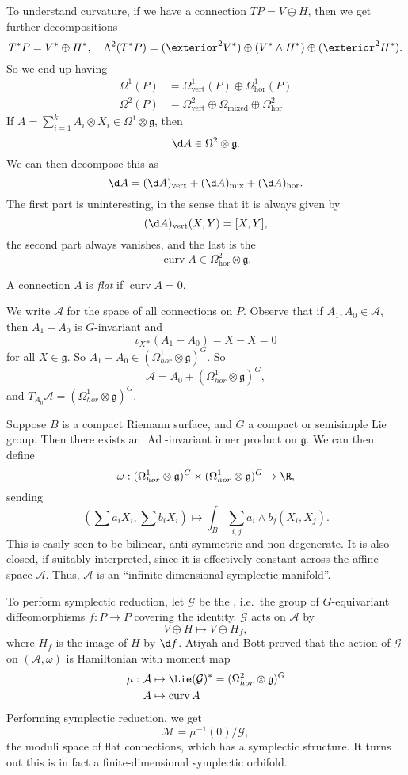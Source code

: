 \documentclass[a4paper]{article}
\DeclareMathOperator{\Ad}{Ad}
\DeclareMathOperator{\curv}{curv}
\begin{document}
To understand curvature, if we have a connection $TP = V \oplus H$, then we get further decompositions
\[
  T^*P = V^* \oplus H^*,\quad \Lambda^2 (T^*P) = (\exterior^2 V^*) \oplus (V^* \wedge H^*) \oplus (\exterior^2 H^*).
\]
So we end up having
\begin{align*}
  \Omega^1(P) &= \Omega^1_{\mathrm{vert}}(P) \oplus \Omega^1_{\mathrm{hor}}(P)\\
  \Omega^2(P) &= \Omega_{\mathrm{vert}}^2 \oplus \Omega_{\mathrm{mixed}} \oplus \Omega^2_{\mathrm{hor}}
\end{align*}
If $A = \sum_{i = 1}^k A_i \otimes X_i \in \Omega^1 \otimes \mathfrak{g}$, then
\[
  \d A \in \Omega^2 \otimes \mathfrak{g}.
\]
We can then decompose this as
\[
  \d A = (\d A)_{\mathrm{vert}}+ (\d A)_{\mathrm{mix}} + (\d A)_{\mathrm{hor}}.
\]
The first part is uninteresting, in the sense that it is always given by
\[
  (\d A)_{\mathrm{vert}}(X, Y) = [X, Y],
\]
the second part always vanishes, and the last is the 
\[
  \curv A \in \Omega_{\mathrm{hor}}^2 \otimes \mathfrak{g}.
\]
\begin{defi}
  A connection $A$ is \emph{flat} if $\curv A = 0$.
\end{defi}
We write $\mathcal{A}$ for the space of all connections on $P$. Observe that if $A_1, A_0 \in \mathcal{A}$, then $A_1 - A_0$ is $G$-invariant and
\[
  \iota_{X^\#}(A_1 - A_0) = X - X = 0
\]
for all $X \in \mathfrak{g}$. So $A_1 - A_0 \in (\Omega^1_{hor} \otimes \mathfrak{g})^G$. So
\[
  \mathcal{A} = A_0 + (\Omega^1_{hor} \otimes \mathfrak{g})^G,
\]
and $T_{A_0} \mathcal{A} = (\Omega^1_{hor} \otimes \mathfrak{g})^G$.

Suppose $B$ is a compact Riemann surface, and $G$ a compact or semisimple Lie group. Then there exists an $\Ad$-invariant inner product on $\mathfrak{g}$. We can then define
\[
  \omega: (\Omega^1_{hor} \otimes \mathfrak{g})^G \times (\Omega_{hor}^1 \otimes \mathfrak{g})^G \to \R,
\]
sending
\[
  \left(\sum a_i X_i, \sum b_i X_i\right) \mapsto \int_B \sum_{i, j} a_i \wedge b_j (X_i, X_j).
\]
This is easily seen to be bilinear, anti-symmetric and non-degenerate. It is also closed, if suitably interpreted, since it is effectively constant across the affine space $\mathcal{A}$. Thus, $\mathcal{A}$ is an ``infinite-dimensional symplectic manifold''.

To perform symplectic reduction, let $\mathcal{G}$ be the , i.e.\ the group of $G$-equivariant diffeomorphisms $f: P \to P$ covering the identity. $\mathcal{G}$ acts on $\mathcal{A}$ by
\[
  V \oplus H \mapsto V \oplus H_f,
\]
where $H_f$ is the image of $H$ by $\d f$. Atiyah and Bott proved that the action of $\mathcal{G}$ on $(\mathcal{A}, \omega)$ is Hamiltonian with moment map
\begin{align*}
  \mu: \mathcal{A} &\mapsto \Lie(\mathcal{G})^* = (\Omega_{hor}^2 \otimes \mathfrak{g})^G\\
  A &\mapsto \curv A
\end{align*}
Performing symplectic reduction, we get
\[
  \mathcal{M} = \mu^{-1}(0)/\mathcal{G},
\]
the moduli space of flat connections, which has a symplectic structure. It turns out this is in fact a finite-dimensional symplectic orbifold.
\end{document}

